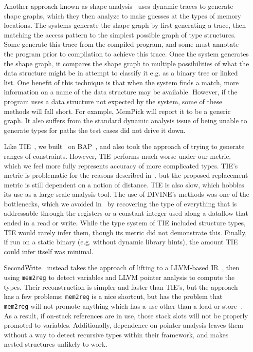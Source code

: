 Another approach known as shape analysis~\cite{August, Haller2013a,White2013,Jung2009,Cozzie} uses dynamic traces to generate shape graphs, which they then analyze to make guesses at the types of memory locations. The systems generate the shape graph by first generating a trace, then matching the access pattern to the simplest possible graph of type structures. Some generate this trace from the compiled program, and some must annotate the program prior to compilation to achieve this trace. Once the system generates the shape graph, it compares the shape graph to multiple possibilities of what the data structure might be in attempt to classify it e.g. as a binary tree or linked list. One benefit of this technique is that when the system finds a match, more information on a name of the data structure may be available. However, if the program uses a data structure not expected by the system, some of these methods will fall short. For example, MemPick will report it to be a generic graph. It also suffers from the standard dynamic analysis issue of being unable to generate types for paths the test cases did not drive it down.

Like TIE~\cite{tie}, we built \bitr\ on BAP~\cite{bap}, and also took the approach of trying to generate ranges of constraints. However, TIE performs much worse under our metric, which we feel more fully represents accuracy of more complicated types. TIE's metric is problematic for the reasons described in~\cite{sw}, but the proposed replacement metric is still dependent on a notion of distance. TIE is also slow, which hobbles its use as a large scale analysis tool. The use of DIVINE's methods was one of the bottlenecks, which we avoided in \bitr\ by recovering the type of everything that is addressable through the registers or a constant integer used along a dataflow that ended in a read or write. While the type system of TIE included structure types, TIE would rarely infer them, though its metric did not demonstrate this. Finally, if run on a static binary (e.g. without dynamic library hints), the amount TIE could infer itself was minimal.

SecondWrite~\cite{sw} instead takes the approach of lifting to a LLVM-based IR~\cite{llvm}, then using \texttt{mem2reg} to detect variables and LLVM pointer analysis to compute the types. Their reconstruction is simpler and faster than TIE's, but the approach has a few problems: \texttt{mem2reg} is a nice shortcut, but has the problem that \texttt{mem2reg} will not promote anything which has a use other than a load or store~\cite{llvm}. As a result, if on-stack references are in use, those stack slots will not be properly promoted to variables. Additionally, dependence on pointer analysis leaves them without a way to detect recursive types within their framework, and makes nested structures unlikely to work.

